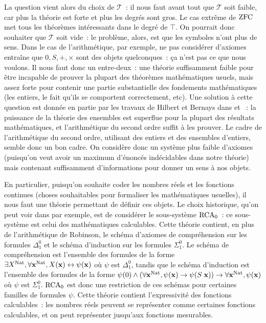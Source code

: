 \documentclass{article}
\begin{document}
La question vient alors du choix de $\mathcal T$~: il nous faut avant tout que $\mathcal T$ soit faible, car plus la théorie est forte et plus les degrés sont gros. Le cas extrême de $\mathrm{ZFC}$ met tous les théorèmes intéressants dans le degré de $\top$. On pourrait donc souhaiter que $\mathcal T$ soit vide~: le problème, alors, est que les symboles n'ont plus de sens. Dans le cas de l'arithmétique, par exemple, ne pas considérer d'axiomes entraîne que $0,S,+,\times$ sont des objets quelconques~: ça n'est pas ce que nous voulons. Il nous faut donc un entre-deux~: une théorie suffisamment faible pour être incapable de prouver la plupart des théorèmes mathématiques usuels, mais assez forte pour contenir une partie substantielle des fondements mathématiques (les entiers, le fait qu'ils se comportent correctement, etc). Une solution à cette question est donnée en partie par les travaux de Hilbert et Bernays dans \cite{Hilbert1935-HILGDM-8} et \cite{Hilbert1974-HILGDM-5}~: la puissance de la théorie des ensembles est superflue pour la plupart des résultats mathématiques, et l'arithmétique du second ordre suffit à les prouver. Le cadre de l'arithmétique du second ordre, utilisant des entiers et des ensembles d'entiers, semble donc un bon cadre. On considère donc un système plus faible d'axiomes (puisqu'on veut avoir un maximum d'énoncés indécidables dans notre théorie) mais contenant suffisamment d'informations pour donner un sens à nos objets.

En particulier, puisqu'on souhaite coder les nombres réels et les fonctions continues (choses souhaitables pour formaliser les mathématiques usuelles), il nous faut une théorie permettant de définir ces objets. Le choix historique, qu'on peut voir dans \cite{Simpson_2009} par exemple, est de considérer le sous-système $\mathrm{RCA}_0$~: ce sous-système est celui des mathématiques calculables. Cette théorie contient, en plus de l'arithmétique de Robinson, le schéma d'axiomes de compréhension sur les formules $\Delta_1^0$ et le schéma d'induction sur les formules $\Sigma_1^0$. Le schéma de compréhension est l'ensemble des formules de la forme $\exists X^{\mathrm{Nat}}, \forall \mathbf{x}^{\mathrm{Nat}}, X(\mathbf{x}) \leftrightarrow \psi(\mathbf{x})$ où $\psi$ est $\Delta_1^0$, tandis que le schéma d'induction est l'ensemble des formules de la forme $\psi(0)\land (\forall \mathbf{x}^{\mathrm{Nat}}, \psi(\mathbf{x}) \to \psi(S\;\mathbf{x})) \to \forall \mathbf{x}^{\mathrm{Nat}}, \psi(\mathbf{x})$ où $\psi$ est $\Sigma_1^0$. $\mathrm{RCA}_0$ est donc une restriction de ces schémas pour certaines familles de formules $\psi$. Cette théorie contient l'expressivité des fonctions calculables~: les nombres réels peuvent se représenter comme certaines fonctions calculables, et on peut représenter jusqu'aux fonctions mesurables.
\end{document}
